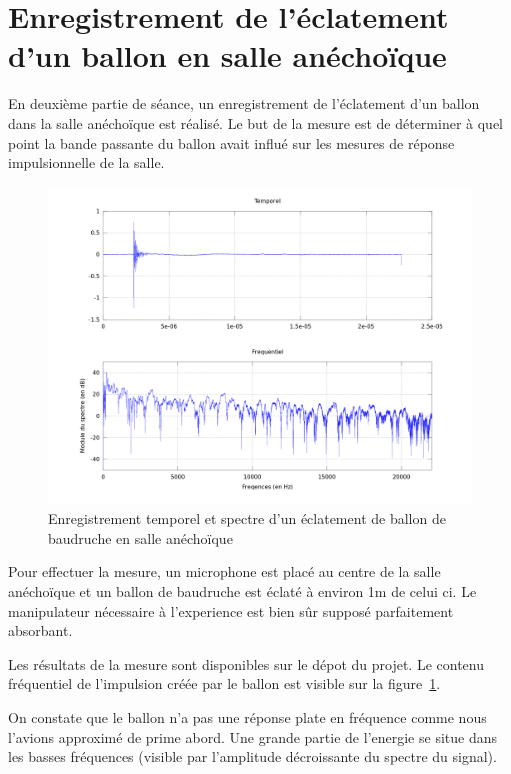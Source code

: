 \documentclass[12pt]{article}
\begin{document}
\section{Enregistrement de l'éclatement d'un ballon en salle anéchoïque} %

En deuxième partie de séance, un enregistrement de l'éclatement d'un ballon dans la salle anéchoïque est réalisé. Le but de la mesure est de déterminer à quel point la bande passante du ballon avait influé sur les mesures de réponse impulsionnelle de la salle.

\begin{figure}[h!]
	\begin{center}
	\includegraphics[width=15cm]{rep_ballon_anecho.png}
    \end{center}
    \caption{\label{ballon}Enregistrement temporel et spectre d'un éclatement de ballon de baudruche en salle anéchoïque}
\end{figure}

Pour effectuer la mesure, un microphone est placé au centre de la salle anéchoïque et un ballon de baudruche est éclaté à environ 1m de celui ci. Le manipulateur nécessaire à l'experience est bien sûr  supposé parfaitement absorbant.

Les résultats de la mesure sont disponibles sur le dépot du projet.
Le contenu fréquentiel de l'impulsion créée par le ballon est visible sur la figure~\ref{ballon}.

On constate que le ballon n'a pas une réponse plate en fréquence comme nous l'avions approximé de prime abord. Une grande partie de l'energie se situe dans les basses fréquences (visible par l'amplitude décroissante du spectre du signal).
\end{document}
